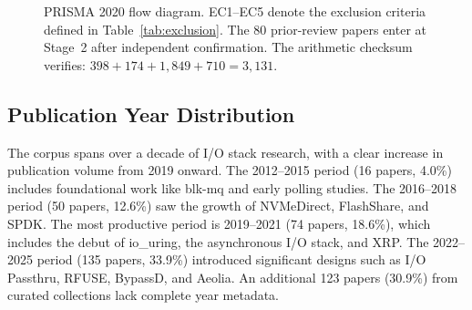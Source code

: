 \documentclass[conference]{IEEEtran}
\begin{document}
\begin{figure}[t]
{
}%
\caption{PRISMA 2020 flow diagram. EC1--EC5 denote the exclusion criteria defined in Table~\ref{tab:exclusion}. The 80 prior-review papers enter at Stage~2 after independent confirmation. The arithmetic checksum verifies: $398 + 174 + 1{,}849 + 710 = 3{,}131$.}
\label{fig:prisma}
\end{figure}

\subsection{Publication Year Distribution}

The corpus spans over a decade of I/O stack research, with a clear increase in publication volume from 2019 onward. The 2012--2015 period (16 papers, 4.0\%) includes foundational work like blk-mq and early polling studies. The 2016--2018 period (50 papers, 12.6\%) saw the growth of NVMeDirect, FlashShare, and SPDK. The most productive period is 2019--2021 (74 papers, 18.6\%), which includes the debut of io\_uring, the asynchronous I/O stack, and XRP. The 2022--2025 period (135 papers, 33.9\%) introduced significant designs such as I/O Passthru, RFUSE, BypassD, and Aeolia. An additional 123 papers (30.9\%) from curated collections lack complete year metadata.
\end{document}
